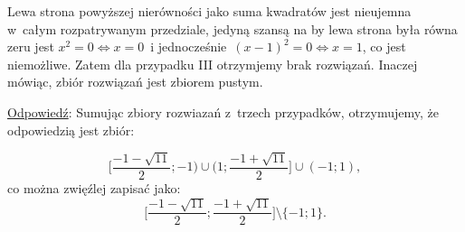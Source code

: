 \begin{rozw}
Lewa strona powyższej nierówności jako suma kwadratów jest nieujemna w~całym rozpatrywanym przedziale, jedyną szansą na by lewa strona była równa zeru jest $x^2 = 0  \iff x=0$~i jednocześnie~$(x-1)^2=0 \iff x=1$, co jest niemożliwe. 
Zatem dla przypadku III otrzymjemy brak rozwiązań. Inaczej mówiąc, zbiór rozwiązań jest zbiorem pustym.

\underline{Odpowiedź}: Sumując zbiory rozwiazań z~trzech przypadków, otrzymujemy, że odpowiedzią jest zbiór:

\[ \Big[\frac{-1-\sqrt{11}}{2}; -1\Big) \cup \Big(1; \frac{-1+\sqrt{11}}{2}\Big] \cup (-1;1), \]
co można zwięźlej zapisać jako:
\[ \Big[\frac{-1-\sqrt{11}}{2};\frac{-1+\sqrt{11}}{2}\Big] \setminus \{-1;1\}. \]

$ $


\end{rozw}

    
%
